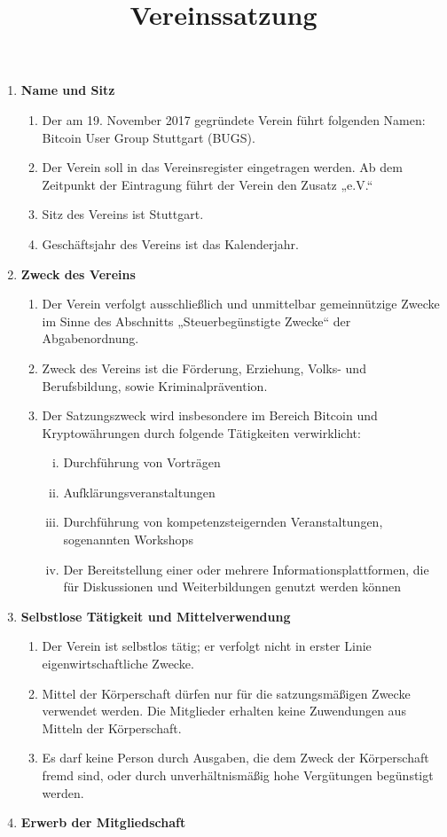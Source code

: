 \documentclass[a4paper,11pt]{article}
\title{\textsf{\textbf{Vereinssatzung}}}
\author{}
\date{}
\begin{document}
\maketitle

\begin{enumerate}[§ 1.]
\item \textsf{\textbf{Name und Sitz}}

\begin{enumerate}[1.]
\item Der am 19. November 2017 gegründete Verein führt folgenden Namen: Bitcoin User Group Stuttgart (BUGS).
\item Der Verein soll in das Vereinsregister eingetragen werden. Ab dem Zeitpunkt der Eintragung führt der Verein den Zusatz „e.V.“
\item Sitz des Vereins ist Stuttgart.
\item Geschäftsjahr des Vereins ist das Kalenderjahr.
\end{enumerate}

\item \textsf{\textbf{Zweck des Vereins}}
\begin{enumerate}[1.]
\item Der Verein verfolgt ausschließlich und unmittelbar gemeinnützige Zwecke im Sinne des Abschnitts „Steuerbegünstigte Zwecke“ der Abgabenordnung.
\item Zweck des Vereins ist die Förderung, Erziehung, Volks- und Berufsbildung, sowie Kriminalprävention.
\item Der Satzungszweck wird insbesondere im Bereich Bitcoin und Kryptowährungen durch folgende Tätigkeiten verwirklicht:
\begin{enumerate}[i)]
\item Durchführung von Vorträgen
\item Aufklärungsveranstaltungen
\item Durchführung von kompetenzsteigernden Veranstaltungen, sogenannten Workshops
\item Der Bereitstellung einer oder mehrere Informationsplattformen, die für Diskussionen und
Weiterbildungen genutzt werden können
\end{enumerate}
\end{enumerate}

\item \textsf{\textbf{Selbstlose Tätigkeit und Mittelverwendung}}

\begin{enumerate}[1.]
\item Der Verein ist selbstlos tätig; er verfolgt nicht in erster Linie eigenwirtschaftliche Zwecke.
\item Mittel der Körperschaft dürfen nur für die satzungsmäßigen Zwecke verwendet werden. Die
Mitglieder erhalten keine Zuwendungen aus Mitteln der Körperschaft.
\item Es darf keine Person durch Ausgaben, die dem Zweck der Körperschaft fremd sind, oder durch
unverhältnismäßig hohe Vergütungen begünstigt werden.
\end{enumerate}
\newpage
\item \textsf{\textbf{Erwerb der Mitgliedschaft}}


\end{enumerate}
\end{document}
